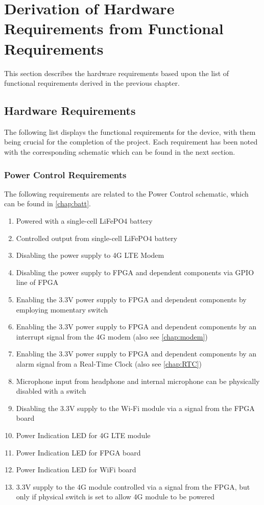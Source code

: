 
\chapter{Derivation of Hardware Requirements from Functional Requirements} %

\label{Chapter4} %

This section describes the hardware requirements based upon the list of functional requirements derived in the previous chapter.

\section{Hardware Requirements}

The following list displays the functional requirements for the device, with them being crucial for the completion of the project. Each requirement has been noted with the corresponding schematic which can be found in the next section.

\subsection{Power Control Requirements}
The following requirements are related to the Power Control schematic, which can be found in \autoref{chap:batt}.
\begin{enumerate}
\item Powered with a single-cell LiFePO4 battery
\item Controlled output from single-cell LiFePO4 battery 
\item Disabling the power supply to 4G LTE Modem
\item Disabling the power supply to FPGA and dependent components via GPIO line of FPGA
\item Enabling the 3.3V power supply to FPGA and dependent components by employing momentary switch
\item Enabling the 3.3V power supply to FPGA and dependent components by an interrupt signal from the 4G modem (also see \autoref{chap:modem})
\item Enabling the 3.3V power supply to FPGA and dependent components by an alarm signal from a Real-Time Clock (also see \autoref{chap:RTC})
\item Microphone input from headphone and internal microphone can be physically disabled with a switch 
\item Disabling the 3.3V supply to the Wi-Fi module via a signal from the FPGA board
\item Power Indication LED for 4G LTE module
\item Power Indication LED for FPGA board 
\item Power Indication LED for WiFi board
\item 3.3V supply to the 4G module controlled via a signal from the FPGA, but only if physical switch is set to allow 4G module to be powered
\end{enumerate}

